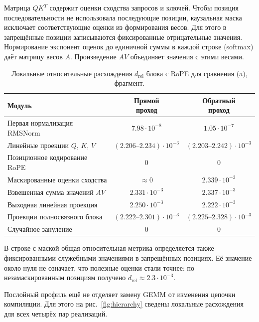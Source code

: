 Матрица $QK^T$ содержит оценки сходства запросов и ключей.
Чтобы позиция последовательности не использовала последующие позиции,
каузальная маска исключает соответствующие оценки из формирования
весов. Для этого в запрещённые позиции записываются фиксированные
отрицательные значения. Нормирование экспонент оценок до единичной суммы в каждой строке
(softmax) даёт матрицу весов $A$.
Произведение $AV$ объединяет значения с этими весами.

\begin{table}[htbp]
    \centering
    \caption{Локальные относительные расхождения $d_{\mathrm{rel}}$
        блока с RoPE для сравнения (a), фрагмент.}
    \label{tab:rope}
    \begin{tabular}{p{6.3cm} c c}
        \hline
        Модуль & \shortstack{Прямой\\проход} & \shortstack{Обратный\\проход} \\
        \hline
        Первая нормализация RMSNorm & $7.98\cdot10^{-8}$ & $1.05\cdot10^{-7}$ \\
        Линейные проекции $Q$, $K$, $V$ & $(2.206\text{--}2.234)\cdot10^{-3}$ & $(2.203\text{--}2.242)\cdot10^{-3}$ \\
        Позиционное кодирование RoPE & $0$ & $0$ \\
        Маскированные оценки сходства & $\approx0$ & $2.339\cdot10^{-3}$ \\
        Взвешенная сумма значений $AV$ & $2.331\cdot10^{-3}$ & $2.337\cdot10^{-3}$ \\
        Выходная линейная проекция & $2.250\cdot10^{-3}$ & $2.222\cdot10^{-3}$ \\
        Проекции полносвязного блока & $(2.222\text{--}2.301)\cdot10^{-3}$ & $(2.225\text{--}2.328)\cdot10^{-3}$ \\
        Случайное зануление & $0$ & $0$ \\
        \hline
    \end{tabular}
\end{table}

В строке с маской общая относительная метрика определяется
также фиксированными служебными значениями в запрещённых позициях.
Её значение около нуля не означает, что полезные оценки стали точнее:
по незамаскированным позициям получено
$d_{\mathrm{rel}}\approx2.3\cdot10^{-3}$.

Послойный профиль ещё не отделяет замену GEMM от изменения
цепочки компиляции. Для этого на рис.~\ref{fig:hierarchy} сведены
локальные расхождения для всех четырёх пар реализаций.

